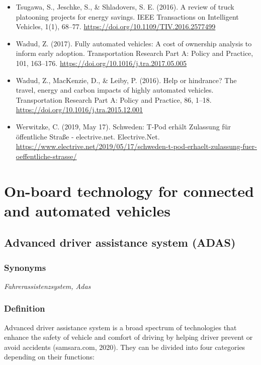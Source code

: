 \documentclass[
]{book}
\begin{document}
\begin{itemize}
\item
  Tsugawa, S., Jeschke, S., \& Shladovers, S. E. (2016). A review of truck platooning projects for energy savings. IEEE Transactions on Intelligent Vehicles, 1(1), 68--77. \url{https://doi.org/10.1109/TIV.2016.2577499}
\item
  Wadud, Z. (2017). Fully automated vehicles: A cost of ownership analysis to inform early adoption. Transportation Research Part A: Policy and Practice, 101, 163--176. \url{https://doi.org/10.1016/j.tra.2017.05.005}
\item
  Wadud, Z., MacKenzie, D., \& Leiby, P. (2016). Help or hindrance? The travel, energy and carbon impacts of highly automated vehicles. Transportation Research Part A: Policy and Practice, 86, 1--18. \url{https://doi.org/10.1016/j.tra.2015.12.001}
\item
  Werwitzke, C. (2019, May 17). Schweden: T-Pod erhält Zulassung für öffentliche Straße - electrive.net. Electrive.Net. \url{https://www.electrive.net/2019/05/17/schweden-t-pod-erhaelt-zulassung-fuer-oeffentliche-strasse/}
\end{itemize}

\hypertarget{onboard}{%
\chapter{On-board technology for connected and automated vehicles}\label{onboard}}

\hypertarget{adas}{%
\section{Advanced driver assistance system (ADAS)}\label{adas}}

\hypertarget{synonyms-21}{%
\subsection{Synonyms}\label{synonyms-21}}

\emph{Fahrerassistenzsystem, Adas}

\hypertarget{definition-23}{%
\subsection*{Definition}\label{definition-23}}

Advanced driver assistance system is a broad spectrum of technologies that enhance the safety of vehicle and comfort of driving by helping driver prevent or avoid accidents (samsara.com, 2020). They can be divided into four categories depending on their functions:
\end{document}
